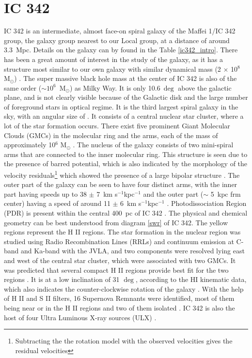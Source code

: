 \documentclass[../main/thesis_msc.tex]{subfiles}
\begin{document}
\section{IC 342}
IC 342 is an intermediate, almost face-on spiral galaxy of the Maffei 1/IC 342 group, the galaxy group nearest to our Local group, at a distance of around 3.3~Mpc\citep{distance_ic342}. Details on the galaxy can by found in the Table \ref{ic342_intro}. There has been a great amount of interest in the study of the galaxy, as it has a structure most similar to our own galaxy with similar dynamical mass (2 $\times$ 10$^8$ M$_\odot$) \citep{dyn_mas}. The super massive black hole mass at the center of IC 342 is also of the same order ($\sim 10^6$~M$_\odot$) as Milky Way. It is only 10.6$~\deg$ above the galactic plane, and is not clearly visible because of the Galactic disk and the large number of foreground stars in optical regime. It is the third largest spiral galaxy in the sky, with an angular size of . It consists of a central nuclear star cluster, where a lot of the star formation occurs. There exist five prominent Giant Molecular Clouds (GMCs) in the molecular ring and the arms, each of the mass of approximately 10$^6$ M$_{\odot}$ \citep{ic342_2}. The nucleus of the galaxy consists of two mini-spiral arms that are connected to the inner molecular ring. This structure is seen due to the presence of barred potential, which is also indicated by the morphology of the velocity residuals\footnote{Subtracting the the rotation model with the observed velocities gives the residual velocities} which showed the presence of a large bipolar structure \citep{H1}. The outer part of the galaxy can be seen to have four distinct arms, with the inner part having speeds up to 38 $\pm$ 7~km s$^{-1}$kpc$^{-1}$ and the outer part ($\sim$ 5~kpc frm center) having a speed of around 11 $\pm$ 6~km s$^{-1}$kpc$^{-1}$ \citep{arms}. Photodissociation Region (PDR) is present within the central 400~pc of IC 342 \citep{ic342_1}. The physical and chemical geometry can be best understood from diagram \ref{swr} of IC 342. The yellow regions represent the H II regions. The star formation in the nuclear region was studied using Radio Recombination Lines (RRLs) and continuum emission at C- band and Ka-band with the JVLA, and two components were resolved lying east and west of the central star cluster, which were associated with two GMCs. It was predicted that several compact H II regions provide best fit for the two regions \citep{ic342_3}. It is at a low inclination of 31 $\deg$, according to the HI kinematic data, which also indicates the counter-clockwise rotation of the galaxy \citep{H1}. With the help of H II and S II filters, 16 Supernova Remnants were identified, most of them being near or in the H II regions and two of them isolated \citep{snr}. IC 342 is also the host of four Ultra Luminous X-ray sources (ULX) \citep{ulx}. 
\end{document}
